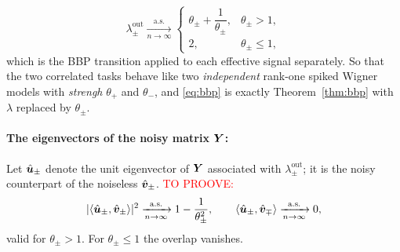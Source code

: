 \documentclass[11pt]{article}
\begin{document}
\begin{equation}
    \lambda_\pm^{\mathrm{out}} \xrightarrow[n\to\infty]{\text{a.s.}}
    \begin{cases}
        \theta_\pm + \dfrac{1}{\theta_\pm}, & \theta_\pm > 1, \\[6pt]
        2, & \theta_\pm \le 1 ,
    \end{cases}
    \label{eq:bbp}
\end{equation}
which is the BBP transition applied to each effective signal separately. So that the two correlated tasks behave like two \emph{independent} rank-one spiked Wigner models with \emph{strengh} $\theta_+$ and $\theta_-$, and \eqref{eq:bbp} is exactly Theorem~\ref{thm:bbp} with $\lambda$ replaced by $\theta_\pm$.

\paragraph{The eigenvectors of the noisy matrix $\bm{Y}$:}
Let $\hat{\bm{u}}_\pm$ denote the unit eigenvector of $\bm{Y}$ associated with $\lambda_\pm^{\mathrm{out}}$; it is the noisy counterpart of the noiseless $\hat{\bm{v}}_\pm$. \textcolor{red}{TO PROOVE:}
\begin{equation}
    |\langle \hat{\bm{u}}_\pm, \hat{\bm{v}}_\pm \rangle|^2 \xrightarrow[n\to\infty]{\text{a.s.}} 1 - \frac{1}{\theta_\pm^{2}},
    \qquad
    \langle \hat{\bm{u}}_\pm, \hat{\bm{v}}_\mp \rangle \xrightarrow[n\to\infty]{\text{a.s.}} 0 ,
    \label{eq:bbp-vec}
\end{equation}
valid for $\theta_\pm > 1$. For $\theta_\pm \le 1$ the overlap vanishes.
\end{document}
